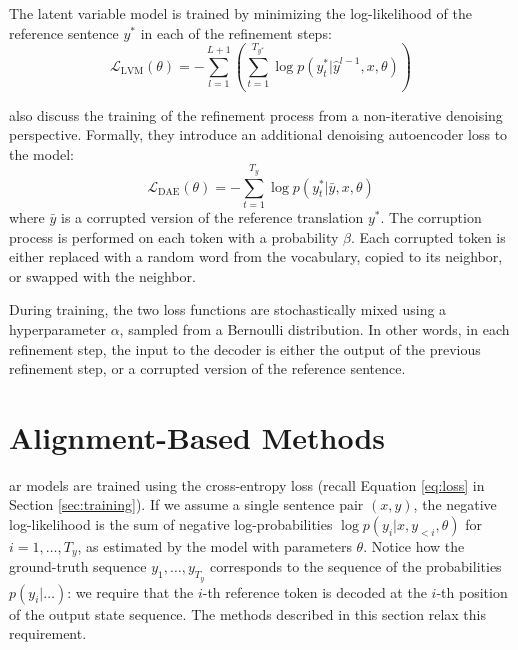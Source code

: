 The latent variable model is trained by minimizing the log-likelihood of the
reference sentence $y^*$ in each of the refinement steps:
\begin{equation}
  \mathcal{L}_{\text{LVM}}(\theta) = - \sum_{l=1}^{L+1} \left(
    \sum_{t=1}^{T_{y^*}} \log p(y_t^* | \hat{y}^{l-1}, x, \theta)
  \right) \label{eq:refinement-lvm-loss}
\end{equation}

\citet{lee-etal-2018-deterministic} also discuss the training of the refinement
process from a non-iterative denoising perspective. Formally, they introduce an
additional denoising autoencoder loss to the model:
%
\begin{equation}
  \mathcal{L}_{\text{DAE}}(\theta) = - \sum_{t=1}^{T_y} \log p(y_t^* | \bar{y}, x, \theta)
\end{equation}
where $\bar{y}$ is a corrupted version of the reference translation $y^*$. The
corruption process is performed on each token with a probability $\beta$. Each
corrupted token is either replaced with a random word from the vocabulary,
copied to its neighbor, or swapped with the neighbor.

During training, the two loss functions are stochastically mixed using a
hyperparameter $\alpha$, sampled from a Bernoulli distribution. In other words,
in each refinement step, the input to the decoder is either the output of the
previous refinement step, or a corrupted version of the reference sentence.

\section{Alignment-Based Methods}%
\label{sec:nat:alignment}

\Acl{ar} models are trained using the cross-entropy loss (recall Equation
\ref{eq:loss} in Section \ref{sec:training}). If we assume a single sentence
pair $(x,y)$, the negative log-likelihood is the sum of negative
log-probabilities $\log p(y_i|x, y_{<i}, \theta)$ for $i=1, \ldots, T_y$, as
estimated by the model with parameters $\theta$.  Notice how the ground-truth
sequence $y_1, \ldots, y_{T_y}$ corresponds to the sequence of the
probabilities $p(y_i|\ldots)$: we require that the $i$-th reference token is
decoded at the $i$-th position of the output state sequence. The methods
described in this section relax this requirement.

